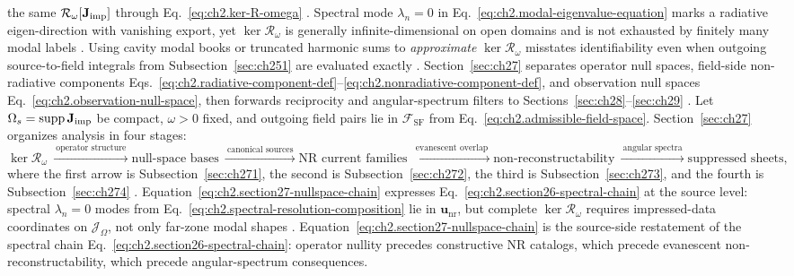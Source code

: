 the same \(\mathcal{R}_\omega[\mathbf{J}_{\mathrm{imp}}]\) through Eq.~\eqref{eq:ch2.ker-R-omega}
\cite{stratton1941}. Spectral mode \(\lambda_n=0\) in
Eq.~\eqref{eq:ch2.modal-eigenvalue-equation} marks a radiative eigen-direction with
vanishing export, yet \(\ker\mathcal{R}_\omega\) is generally infinite-dimensional on open
domains and is not exhausted by finitely many modal labels
\cite{harrington2001}. Using cavity modal books or truncated harmonic sums to
\emph{approximate} \(\ker\mathcal{R}_\omega\) misstates identifiability even when outgoing
source-to-field integrals from Subsection~\ref{sec:ch251} are evaluated exactly
\cite{jackson1999}. Section~\ref{sec:ch27} separates operator null spaces,
field-side non-radiative components Eqs.~\eqref{eq:ch2.radiative-component-def}--\eqref{eq:ch2.nonradiative-component-def},
and observation null spaces Eq.~\eqref{eq:ch2.observation-null-space}, then forwards
reciprocity and angular-spectrum filters to Sections~\ref{sec:ch28}--\ref{sec:ch29}
\cite{stratton1941}. Let \(\Omega_s=\operatorname{supp}\mathbf{J}_{\mathrm{imp}}\) be compact, \(\omega>0\) fixed, and outgoing field
pairs lie in \(\mathcal{F}_{\mathrm{SF}}\) from
Eq.~\eqref{eq:ch2.admissible-field-space}. Section~\ref{sec:ch27} organizes analysis in four
stages:
\begin{equation}
\label{eq:ch2.section27-nullspace-chain}
\ker\mathcal{R}_\omega
\ \xrightarrow{\ \text{operator structure}\ }
\text{null-space bases}
\ \xrightarrow{\ \text{canonical sources}\ }
\text{NR current families}
\ \xrightarrow{\ \text{evanescent overlap}\ }
\text{non-reconstructability}
\ \xrightarrow{\ \text{angular spectra}\ }
\text{suppressed sheets},
\end{equation}
where the first arrow is Subsection~\ref{sec:ch271}, the second is Subsection~\ref{sec:ch272},
the third is Subsection~\ref{sec:ch273}, and the fourth is Subsection~\ref{sec:ch274}
\cite{stratton1941}. Equation~\eqref{eq:ch2.section27-nullspace-chain}
expresses Eq.~\eqref{eq:ch2.section26-spectral-chain} at the source level: spectral
\(\lambda_n=0\) modes from Eq.~\eqref{eq:ch2.spectral-resolution-composition} lie in
\(\mathbf{u}_{\mathrm{nr}}\), but complete \(\ker\mathcal{R}_\omega\) requires impressed-data
coordinates on \(\mathcal{J}_\Omega\), not only far-zone modal shapes
\cite{stratton1941}.
Equation~\eqref{eq:ch2.section27-nullspace-chain} is the source-side restatement
of the spectral chain Eq.~\eqref{eq:ch2.section26-spectral-chain}: operator
nullity precedes constructive NR catalogs, which precede evanescent
non-reconstructability, which precede angular-spectrum consequences.
